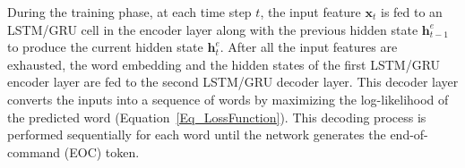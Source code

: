 During the training phase, at each time step $t$, the input feature $\mathbf{x}_t$ is fed to an LSTM/GRU cell in the encoder layer along with the previous hidden state $\mathbf{h}_{t-1}^e$ to produce the current hidden state $\mathbf{h}_t^e$. After all the input features are exhausted, the word embedding and the hidden states of the first LSTM/GRU encoder layer are fed to the second LSTM/GRU decoder layer. This decoder layer converts the inputs into a sequence of words by maximizing the log-likelihood of the predicted word (Equation~\ref{Eq_LossFunction}). This decoding process is performed sequentially for each word until the network generates the end-of-command (\textsf{EOC}) token.















